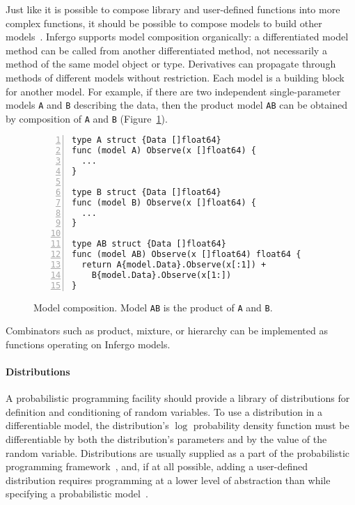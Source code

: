 \documentclass[sigplan,review,10pt,anonymous]{acmart}
\begin{document}
\begin{sloppypar}
Just like it is possible to compose library and user-defined
functions into more complex functions, it should be possible to
compose models to build other models~\cite{THS+17,SSW+18}.
Infergo supports model composition organically: a differentiated
model method can be called from another differentiated method,
not necessarily a method of the same model object or type.
Derivatives can propagate through methods of different models
without restriction. Each model is a building block for another
model. For example, if there are two independent
single-parameter models \lstinline{A} and \lstinline{B}
describing the data, then the product model \lstinline{AB} can
be obtained by composition of \lstinline{A} and \lstinline{B}
(Figure~\ref{fig:composition}).
\begin{figure}
  \begin{lstlisting}[framexleftmargin=10pt,numbers=left]
type A struct {Data []float64}
func (model A) Observe(x []float64) {
  ...
}

type B struct {Data []float64}
func (model B) Observe(x []float64) {
  ...
}

type AB struct {Data []float64}
func (model AB) Observe(x []float64) float64 {
  return A{model.Data}.Observe(x[:1]) + 
    B{model.Data}.Observe(x[1:])
}
  \end{lstlisting}
  \caption{Model composition. Model \lstinline{AB} is the
  product of \lstinline{A} and \lstinline{B}.}
  \label{fig:composition}
\end{figure}
Combinators such as product, mixture, or hierarchy can be
implemented as functions operating on Infergo models.

\paragraph{Distributions} A probabilistic programming facility
should provide a library of distributions for definition and
conditioning of random variables. To use a distribution in a
differentiable model, the distribution's $\log$ probability
density function must be differentiable by both the
distribution's parameters and by the value of the random
variable. Distributions are usually supplied as a part of the
probabilistic programming framework~\cite{TMY+16,Stan17,GXG18},
and, if at all possible, adding a user-defined distribution
requires programming at a lower level of abstraction than while
specifying a probabilistic model~\cite{S16,TMY+16,AMP17}.


\end{sloppypar}
\end{document}
